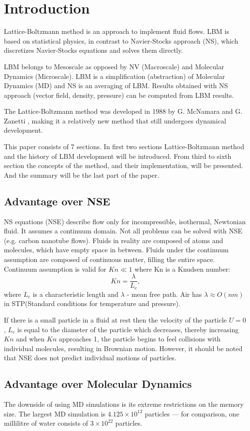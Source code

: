 
\section{Introduction}

Lattice-Boltzmann method is an approach to implement fluid flows. LBM is based on statistical physics, in contrast to Navier-Stocks approach (NS), which discretizes Navier-Stocks equations and solves them directly.

LBM belongs to Mesoscale as opposed by NV (Macroscale) and Molecular Dynamics (Microscale). LBM is a simplification (abstraction) of Molecular Dynamics (MD) and NS is an averaging of LBM. Results obtained with NS approach (vector field, density, pressure) can be computed from LBM results.

The Lattice-Boltzmann method was developed in 1988 by G. McNamara and G. Zanetti \cite{succi}, making it a relatively new method that still undergoes dynamical development.

This paper consists of 7 sections. In first two sections Lattice-Boltzmann method and the history of LBM development will be introduced. From third to sixth section the concepts of the method, and their  implementation, will be presented. And the  summary will be the last part of the paper.

\subsection{Advantage over NSE}

NS equations (NSE) describe flow only for incompressible, isothermal, Newtonian fluid. It assumes a continuum domain. Not all problems can be solved with NSE (e.g. carbon nanotube flows). Fluids in reality are composed of atoms and molecules, which have empty space in between. Fluids under the continuum assumption are composed of continuous matter, filling the entire space. Continuum assumption is valid for $Kn \ll 1$ where Kn is a Knudsen number:
\begin{equation}
Kn=\frac{\lambda}{L_c},
\end{equation}
where $L_c$ is a characteristic length and $\lambda$ - mean free path. Air has $\lambda \approx O(nm)$ in STP(Standard conditions for temperature and pressure).

If there is a small particle in a fluid at rest then the velocity of the particle $U=0$, $L_c$ is equal to the diameter of the particle which decreases, thereby increasing $Kn$ and when $Kn$ approaches 1, the particle begins to feel collisions with individual molecules, resulting in Brownian motion. However, it should be noted that NSE does not predict individual motions of particles.

\subsection{Advantage over Molecular Dynamics}

The downside of using MD simulations is its extreme restrictions on the memory size. The largest MD simulation is $4.125\times 10^{12}$ particles \cite{inside} — for comparison, one millilitre of water consists of $3\times 10^{22}$ particles.